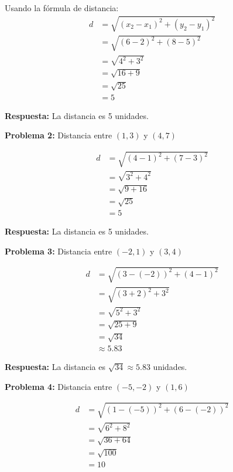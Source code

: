 Usando la fórmula de distancia:
\begin{align*}
d &= \sqrt{(x_2 - x_1)^2 + (y_2 - y_1)^2} \\
  &= \sqrt{(6 - 2)^2 + (8 - 5)^2} \\
  &= \sqrt{4^2 + 3^2} \\
  &= \sqrt{16 + 9} \\
  &= \sqrt{25} \\
  &= 5
\end{align*}

\textbf{Respuesta:} La distancia es 5 unidades.

\medskip

\textbf{Problema 2:} Distancia entre $(1, 3)$ y $(4, 7)$

\begin{align*}
d &= \sqrt{(4 - 1)^2 + (7 - 3)^2} \\
  &= \sqrt{3^2 + 4^2} \\
  &= \sqrt{9 + 16} \\
  &= \sqrt{25} \\
  &= 5
\end{align*}

\textbf{Respuesta:} La distancia es 5 unidades.

\medskip

\textbf{Problema 3:} Distancia entre $(-2, 1)$ y $(3, 4)$

\begin{align*}
d &= \sqrt{(3 - (-2))^2 + (4 - 1)^2} \\
  &= \sqrt{(3 + 2)^2 + 3^2} \\
  &= \sqrt{5^2 + 3^2} \\
  &= \sqrt{25 + 9} \\
  &= \sqrt{34} \\
  &\approx 5.83
\end{align*}

\textbf{Respuesta:} La distancia es $\sqrt{34} \approx 5.83$ unidades.

\medskip

\textbf{Problema 4:} Distancia entre $(-5, -2)$ y $(1, 6)$

\begin{align*}
d &= \sqrt{(1 - (-5))^2 + (6 - (-2))^2} \\
  &= \sqrt{6^2 + 8^2} \\
  &= \sqrt{36 + 64} \\
  &= \sqrt{100} \\
  &= 10
\end{align*}

